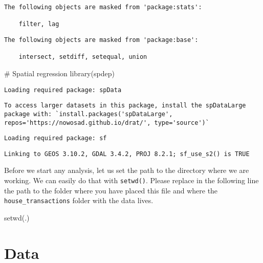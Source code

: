 \documentclass[
  letterpaper,
  krantz2]{style/krantz}
\newenvironment{Shaded}{\begin{snugshade}}{\end{snugshade}}
\newcommand{\CommentTok}[1]{\textcolor[rgb]{0.37,0.37,0.37}{#1}}
\newcommand{\FunctionTok}[1]{\textcolor[rgb]{0.28,0.35,0.67}{#1}}
\newcommand{\NormalTok}[1]{\textcolor[rgb]{0.00,0.23,0.31}{#1}}
\newcommand{\StringTok}[1]{\textcolor[rgb]{0.13,0.47,0.30}{#1}}
\begin{document}
\begin{verbatim}
The following objects are masked from 'package:stats':

    filter, lag
\end{verbatim}

\begin{verbatim}
The following objects are masked from 'package:base':

    intersect, setdiff, setequal, union
\end{verbatim}

\begin{Shaded}
\begin{Highlighting}[]
\CommentTok{\# Spatial regression}
\FunctionTok{library}\NormalTok{(spdep)}
\end{Highlighting}
\end{Shaded}

\begin{verbatim}
Loading required package: spData
\end{verbatim}

\begin{verbatim}
To access larger datasets in this package, install the spDataLarge
package with: `install.packages('spDataLarge',
repos='https://nowosad.github.io/drat/', type='source')`
\end{verbatim}

\begin{verbatim}
Loading required package: sf
\end{verbatim}

\begin{verbatim}
Linking to GEOS 3.10.2, GDAL 3.4.2, PROJ 8.2.1; sf_use_s2() is TRUE
\end{verbatim}

Before we start any analysis, let us set the path to the directory where
we are working. We can easily do that with \texttt{setwd()}. Please
replace in the following line the path to the folder where you have
placed this file and where the \texttt{house\_transactions} folder with
the data lives.

\begin{Shaded}
\begin{Highlighting}[]
\FunctionTok{setwd}\NormalTok{(}\StringTok{\textquotesingle{}.\textquotesingle{}}\NormalTok{)}
\end{Highlighting}
\end{Shaded}

\hypertarget{data-3}{%
\section{Data}\label{data-3}}
\end{document}
